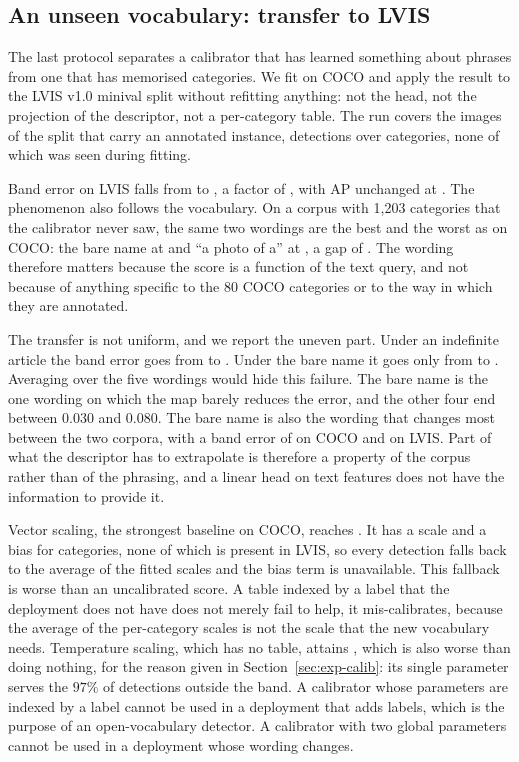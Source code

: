 \subsection{An unseen vocabulary: transfer to LVIS}\label{sec:exp-transfer}

The last protocol separates a calibrator that has learned something about phrases from one that
has memorised categories. We fit on COCO and apply the result to the LVIS v1.0 minival split
without refitting anything: not the head, not the projection of the descriptor, not a per-category
table. The run covers the \NLVISIMG{} images of the split that carry an annotated instance,
\NLVISNDET{} detections over \NLVISCAT{} categories, none of which was seen during fitting.


Band error on LVIS falls from \TRBANDID{} to \TRBANDPHC{}, a factor of \TRFACTOR, with AP
unchanged at \TRAPID. The phenomenon also follows the vocabulary. On a corpus with 1{,}203
categories that the calibrator never saw, the same two wordings are the best and the worst as on
COCO: the bare name at \TRAPHI{} and ``a photo of a'' at \TRAPLO{}, a gap of \TRAPGAP. The wording
therefore matters because the score is a function of the text query, and not because of anything
specific to the 80 COCO categories or to the way in which they are annotated.

The transfer is not uniform, and we report the uneven part. Under an indefinite article the band
error goes from \TRARTID{} to \TRARTPHC. Under the bare name it goes only from \TRBAREID{} to
\TRBAREPHC. Averaging over the five wordings would hide this failure. The bare name is the one
wording on which the map barely reduces the error, and the other four end between $0.030$ and
$0.080$. The bare name is also the wording that changes most between the two corpora, with a band
error of \COCBARE{} on COCO and \TRBAREID{} on LVIS. Part of what the descriptor has to
extrapolate is therefore a property of the corpus rather than of the phrasing, and a linear head
on text features does not have the information to provide it.

Vector scaling, the strongest baseline on COCO, reaches \TRBANDVEC. It has a scale and a bias for
\VECSEEN{} categories, none of which is present in LVIS, so every detection falls back to the
average of the fitted scales and the bias term is unavailable. This fallback is worse than an
uncalibrated score. A table indexed by a label that the deployment does not have does not merely
fail to help, it mis-calibrates, because the average of the per-category scales is not the scale
that the new vocabulary needs. Temperature scaling, which has no table, attains \TRBANDTEMP,
which is also worse than doing nothing, for the reason given in Section~\ref{sec:exp-calib}: its
single parameter serves the $97\%$ of detections outside the band. A calibrator whose parameters
are indexed by a label cannot be used in a deployment that adds labels, which is the purpose of an
open-vocabulary detector. A calibrator with two global parameters cannot be used in a deployment
whose wording changes.

